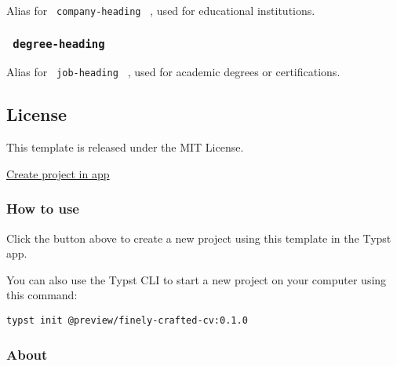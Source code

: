 Alias for \texttt{\ company-heading\ } , used for educational
institutions.

\subsubsection{\texorpdfstring{\texttt{\ degree-heading\ }}{ degree-heading }}\label{degree-heading}

Alias for \texttt{\ job-heading\ } , used for academic degrees or
certifications.

\subsection{License}\label{license}

This template is released under the MIT License.

\href{/app?template=finely-crafted-cv&version=0.1.0}{Create project in
app}

\subsubsection{How to use}\label{how-to-use}

Click the button above to create a new project using this template in
the Typst app.

You can also use the Typst CLI to start a new project on your computer
using this command:

\begin{verbatim}
typst init @preview/finely-crafted-cv:0.1.0
\end{verbatim}



\subsubsection{About}\label{about}

